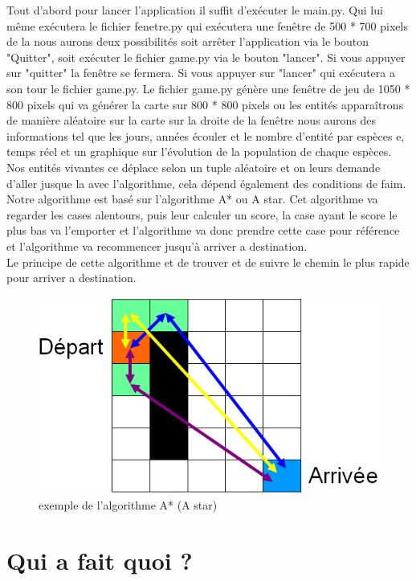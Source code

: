 \documentclass[a4paper, 11pt]{article}
\begin{document}
Tout d'abord pour lancer l'application il suffit d’exécuter le main.py. Qui lui même exécutera le fichier fenetre.py qui exécutera une fenêtre de 500 * 700 pixels de la nous aurons deux possibilités soit arrêter l'application via le bouton "Quitter", soit exécuter le fichier game.py via le bouton "lancer". Si vous appuyer sur "quitter" la fenêtre se fermera. Si vous appuyer sur "lancer" qui exécutera a son tour le fichier game.py. Le fichier game.py génère une fenêtre de jeu de 1050 * 800 pixels qui va générer la carte sur 800 * 800 pixels ou les entités apparaîtrons de manière aléatoire sur la carte
sur la droite de la fenêtre nous aurons des informations tel que les jours, années écouler et le nombre d'entité par espèces e, temps réel et un graphique sur l'évolution de la population de chaque espèces.\\
Nos entités vivantes ce déplace selon un tuple aléatoire et on leurs demande d'aller jusque la avec l'algorithme, cela dépend également des conditions de faim.\\
Notre algorithme est basé sur l'algorithme A* ou A star. Cet algorithme va regarder les cases alentours, puis leur calculer un score, la case ayant le score le plus bas va l'emporter et l'algorithme va donc prendre cette case pour référence et l'algorithme va recommencer jusqu'à arriver a destination.\\
Le principe de cette algorithme et de trouver et de suivre le chemin le plus rapide pour arriver a destination.
\begin{figure}[ht!]
 \centering
 \includegraphics[width=\linewidth]{images/exemple_algo_A_star.png}
 \caption{exemple de l'algorithme A* (A star)}
 \label{fig::example::one}
\end{figure}
\newpage

\section{Qui a fait quoi ?}
\end{document}
